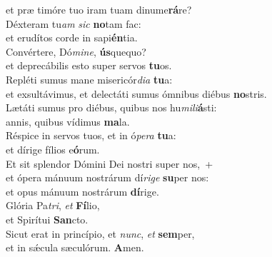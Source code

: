 \oddverse et præ timóre tuo iram tuam dinume\textbf{rá}re?\\
\evenverse Déxteram tu\textit{am} \textit{sic} \textbf{no}tam fac:~\*\\
\evenverse et erudítos corde in sapi\textbf{én}tia.\\
\oddverse Convértere, Dó\textit{mi}\textit{ne}, \textbf{ús}quequo?~\*\\
\oddverse et deprecábilis esto super servos \textbf{tu}os.\\
\evenverse Repléti sumus mane misericór\textit{di}\textit{a} \textbf{tu}a:~\*\\
\evenverse et exsultávimus, et delectáti sumus ómnibus diébus \textbf{no}stris.\\
\oddverse Lætáti sumus pro diébus, quibus nos hu\textit{mi}\textit{li}\textbf{á}sti:~\*\\
\oddverse annis, quibus vídimus \textbf{ma}la.\\
\evenverse Réspice in servos tuos, et in ó\textit{pe}\textit{ra} \textbf{tu}a:~\*\\
\evenverse et dírige fílios e\textbf{ó}rum.\\
\oddverse Et sit splendor Dómini Dei nostri super nos,~+\\
\oddverse  et ópera mánuum nostrárum dí\textit{ri}\textit{ge} \textbf{su}per nos:~\*\\
\oddverse et opus mánuum nostrárum \textbf{dí}rige.\\
\evenverse Glória Pa\textit{tri}, \textit{et} \textbf{Fí}lio,~\*\\
\evenverse et Spirítui \textbf{San}cto.\\
\oddverse Sicut erat in princípio, et \textit{nunc}, \textit{et} \textbf{sem}per,~\*\\
\oddverse et in sǽcula sæculórum. \textbf{A}men.\\
